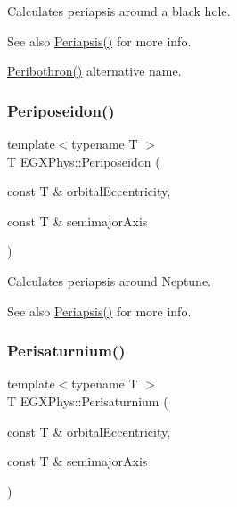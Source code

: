 Calculates periapsis around a black hole. 

\begin{DoxySeeAlso}{See also}
\hyperlink{group___astrophysics_ga4414ac75539371ec874a3d25cad6c9fe}{Periapsis()} for more info. 

\hyperlink{group___astrophysics_gada5892309279a3a687c4eb2f88238e4e}{Peribothron()} alternative name. 
\end{DoxySeeAlso}
\mbox{\label{group___astrophysics_ga237e7af3794202c67e65f64f4c8abc2a}} 
\subsubsection{\texorpdfstring{Periposeidon()}{Periposeidon()}}
{\footnotesize\ttfamily template$<$typename T $>$ \\
T E\+G\+X\+Phys\+::\+Periposeidon (\begin{DoxyParamCaption}\item[{const T \&}]{orbital\+Eccentricity,  }\item[{const T \&}]{semimajor\+Axis }\end{DoxyParamCaption})}



Calculates periapsis around Neptune. 

\begin{DoxySeeAlso}{See also}
\hyperlink{group___astrophysics_ga4414ac75539371ec874a3d25cad6c9fe}{Periapsis()} for more info. 
\end{DoxySeeAlso}
\mbox{\label{group___astrophysics_ga60a50d09d29ebe47cbbfc125c2ea42bf}} 
\subsubsection{\texorpdfstring{Perisaturnium()}{Perisaturnium()}}
{\footnotesize\ttfamily template$<$typename T $>$ \\
T E\+G\+X\+Phys\+::\+Perisaturnium (\begin{DoxyParamCaption}\item[{const T \&}]{orbital\+Eccentricity,  }\item[{const T \&}]{semimajor\+Axis }\end{DoxyParamCaption})}



